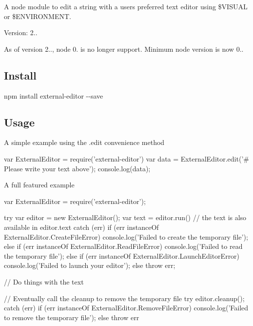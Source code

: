 \href{https://travis-ci.org/mrkmg/node-external-editor/branches}{\tt } \href{https://www.npmjs.com/package/external-editor}{\tt } \href{https://opensource.org/licenses/MIT}{\tt }

A node module to edit a string with a users preferred text editor using \$\+V\+I\+S\+U\+AL or \$\+E\+N\+V\+I\+R\+O\+N\+M\+E\+NT.

Version\+: 2..

As of version 2.., node 0. is no longer support. Minimum node version is now 0..

\subsection*{Install}

{\ttfamily npm install external-\/editor -\/-\/save}

\subsection*{Usage}

A simple example using the {\ttfamily .edit} convenience method \begin{DoxyVerb}var ExternalEditor = require('external-editor')
var data = ExternalEditor.edit('\n\n# Please write your text above');
console.log(data);
\end{DoxyVerb}


A full featured example \begin{DoxyVerb}var ExternalEditor = require('external-editor');

try {
    var editor = new ExternalEditor();
    var text = editor.run()
    // the text is also available in editor.text
} catch (err) {
    if (err instanceOf ExternalEditor.CreateFileError) {
        console.log('Failed to create the temporary file');
    } else if (err instanceOf ExternalEditor.ReadFileError) {
        console.log('Failed to read the temporary file');
    } else if (err instanceOf ExternalEditor.LaunchEditorError) {
        console.log('Failed to launch your editor');
    } else {
        throw err;
    }
}

// Do things with the text

// Eventually call the cleanup to remove the temporary file
try {
    editor.cleanup();   
} catch (err) {
     if (err instanceOf ExternalEditor.RemoveFileError) {
         console.log('Failed to remove the temporary file');
     } else {
        throw err
    }
}
\end{DoxyVerb}


